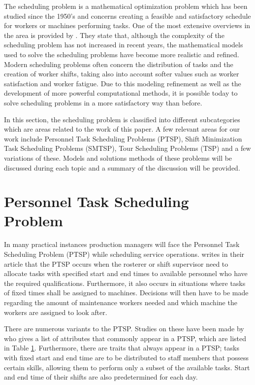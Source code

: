 
The scheduling problem is a mathematical optimization problem which has been studied since the 1950's and concerns creating a feasible and satisfactory schedule for workers or machines performing tasks. One of the most extensive overviews in the area is provided by \citet{ernst_2004}. They state that, although the complexity of the scheduling problem has not increased in recent years, the mathematical models used to solve the scheduling problems have become more realistic and refined. Modern scheduling problems often concern the distribution of tasks and the creation of worker shifts, taking also into account softer values such as worker satisfaction and worker fatigue. Due to this modeling refinement as well as the development of more powerful computational methods, it is possible today to solve scheduling problems in a more satisfactory way than before.

In this section, the scheduling problem is classified into different subcategories which are areas related to the work of this paper. A few relevant areas for our work include Personnel Task Scheduling Problems (PTSP), Shift Minimization Task Scheduling Problems (SMTSP), Tour Scheduling Problems (TSP) and a few variations of these. Models and solutions methods of these problems will be discussed during each topic and a summary of the discussion will be provided.


\section{Personnel Task Scheduling Problem} \label{PTSP}

In many practical instances production managers will face the Personnel Task Scheduling Problem (PTSP) while scheduling service operations. \citet{krishnamoorthy_2001} writes in their article that the PTSP occurs when the rosterer or shift supervisor need to allocate tasks with specified start and end times to available personnel who have the required qualifications. Furthermore, it also occurs in situations where tasks of fixed times shall be assigned to machines. Decisions will then have to be made regarding the amount of maintenance workers needed and which machine the workers are assigned to look after.

There are numerous variants to the PTSP. Studies on these have been made by \citet{krishnamoorthy_2001} who gives a list of attributes that commonly appear in a PTSP, which are listed in Table \ref{PTSP}. Furthermore, there are traits that always appear in a PTSP; tasks with fixed start and end time are to be distributed to staff members that possess certain skills, allowing them to perform only a subset of the available tasks. Start and end time of their shifts are also predetermined for each day.

